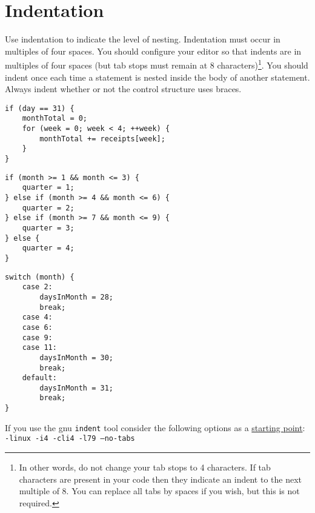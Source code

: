 \documentclass{article}
\begin{document}
\linenumbers

\section{Indentation}
Use indentation to indicate the level of nesting.
Indentation must occur in multiples of four spaces.
You should configure your editor so that indents are in multiples of four spaces (but tab stops must remain at 8 characters)\footnote{In other words, do not change your tab stops to 4 characters. If tab characters are 
present in your code then they indicate an indent to the next multiple of 8. You can replace all tabs by spaces
if you wish, but this is not required.}.
You should indent once each time a statement is nested inside the body of another statement.
Always indent whether or not the control structure uses braces.

\nolinenumbers
\begin{lstlisting}
if (day == 31) {
    monthTotal = 0;
    for (week = 0; week < 4; ++week) {
        monthTotal += receipts[week];
    }
}
\end{lstlisting}

\begin{lstlisting}
if (month >= 1 && month <= 3) {
    quarter = 1;
} else if (month >= 4 && month <= 6) {
    quarter = 2;
} else if (month >= 7 && month <= 9) {
    quarter = 3;
} else {
    quarter = 4;
}
\end{lstlisting}

\begin{lstlisting}
switch (month) {
    case 2:
        daysInMonth = 28;
        break;
    case 4:
    case 6:
    case 9:
    case 11:
        daysInMonth = 30;
        break;
    default:
        daysInMonth = 31;
        break;
}
\end{lstlisting}
\linenumbers

If you use the gnu \texttt{indent} tool consider the following options as a \underline{starting point}:\\
\texttt{-linux -i4 -cli4 -l79 --no-tabs}
\end{document}
